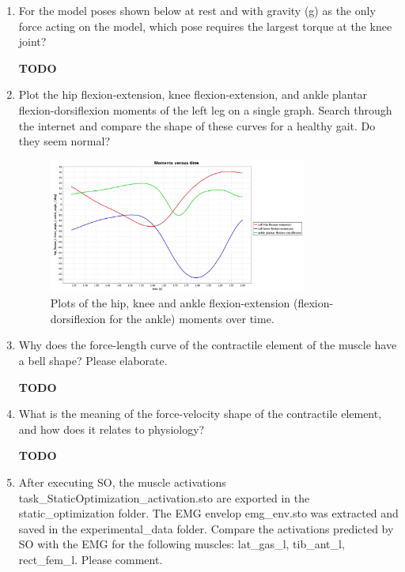 \documentclass[11pt]{article}
\begin{document}
\begin{enumerate}
    \begin{adjustwidth}{0.5cm}{}
        \textit{Answer D. $0 \degree / s$}
    \end{adjustwidth}
    \item For the model poses shown below at rest and with gravity (g) as the only force acting on the model, which pose requires the largest torque at the knee joint?
    \begin{adjustwidth}{0.5cm}{}
        \textbf{TODO}
    \end{adjustwidth}
    \item Plot the hip flexion-extension, knee flexion-extension, and ankle plantar flexion-dorsiflexion moments of the left leg on a single graph. Search through the internet and compare the shape of these curves for a healthy gait. Do they seem normal?
    \begin{adjustwidth}{0.5cm}{}
        \begin{figure}[h!]
            \centering
            \includegraphics[width=0.8\textwidth]{screens/moments_over_time.jpg}
            \caption{Plots of the hip, knee and ankle flexion-extension (flexion-dorsiflexion for the ankle) moments over time.}
        \end{figure}
    \end{adjustwidth}
    \item Why does the force-length curve of the contractile element of the muscle have a bell shape? Please elaborate. 
    \begin{adjustwidth}{0.5cm}{}
        \textbf{TODO}
    \end{adjustwidth}
    \item What is the meaning of the force-velocity shape of the contractile element, and how does it relates to physiology? 
    \begin{adjustwidth}{0.5cm}{}
        \textbf{TODO}
    \end{adjustwidth}
    \item After executing SO, the muscle activations task\_StaticOptimization\_activation.sto are exported in the static\_optimization folder. The EMG envelop emg\_env.sto was extracted and saved in the experimental\_data folder. Compare the activations predicted by SO with the EMG for the following muscles: lat\_gas\_l, tib\_ant\_l, rect\_fem\_l. Please comment.

\end{enumerate}
\end{document}
